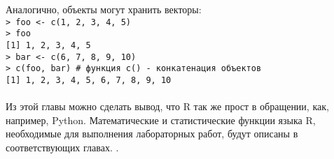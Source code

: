     \indent Аналогично, объекты могут хранить векторы: \\
    \indent \texttt{> foo <- c(1, 2, 3, 4, 5)} \\
    \indent \texttt{> foo} \\
    \indent \texttt{[1] 1, 2, 3, 4, 5} \\
    \indent \texttt{> bar <- c(6, 7, 8, 9, 10)} \\
    \indent \texttt{> c(foo, bar) \# функция c() - конкатенация объектов} \\
    \indent \texttt{[1] 1, 2, 3, 4, 5, 6, 7, 8, 9, 10} \\ \\

    \indent Из этой главы можно сделать вывод, что R так же прост в обращении, как, например, Python. 
    Математические и статистические функции языка R, необходимые для выполнения лабораторных 
    работ, будут описаны в соответствующих главах.
    .
